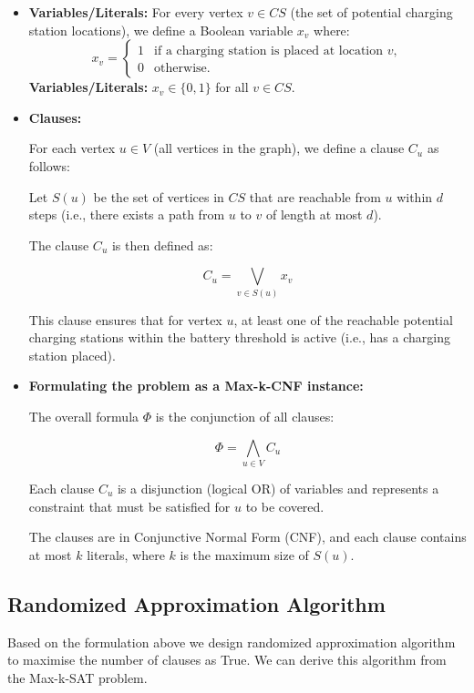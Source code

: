 \documentclass[11pt]{article}
\begin{document}
\begin{itemize}
\item \textbf{Variables/Literals:} 
\newline
For every vertex \( v \in CS \) (the set of potential charging station locations), we define a Boolean variable $x_v$ where:
\[
x_v = 
\begin{cases}
1 & \text{if a charging station is placed at location } v, \\
0 & \text{otherwise.}
\end{cases}
\]
\textbf{Variables/Literals:} \( x_v \in \{0, 1\} \) for all \( v \in CS \).

\item \textbf{Clauses:} 

For each vertex \( u \in V \) (all vertices in the graph), we define a clause \( C_u \) as follows:

Let \( S(u) \) be the set of vertices in \( CS \) that are reachable from \( u \) within \( d \) steps (i.e., there exists a path from \( u \) to \( v \) of length at most \( d \)).

The clause \( C_u \) is then defined as:

\[
C_u = \bigvee_{v \in S(u)} x_v
\]

This clause ensures that for vertex \( u \), at least one of the reachable potential charging stations within the battery threshold is active (i.e., has a charging station placed).

\item \textbf{Formulating the problem as a Max-k-CNF instance:} 


The overall formula \( \Phi \) is the conjunction of all clauses:

\[
\Phi = \bigwedge_{u \in V} C_u
\]

Each clause \( C_u \) is a disjunction (logical OR) of variables and represents a constraint that must be satisfied for \( u \) to be covered.

The clauses are in Conjunctive Normal Form (CNF), and each clause contains at most \( k \) literals, where \( k \) is the maximum size of \( S(u) \).

\end{itemize}

\subsection*{Randomized Approximation Algorithm}
Based on the formulation above we design randomized approximation algorithm to maximise the number of clauses as True. We can derive this algorithm from the Max-k-SAT problem. 
\end{document}
